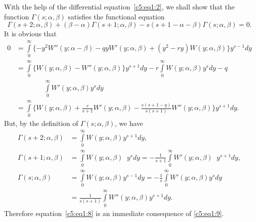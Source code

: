 With the help of the differential equation~\eqref{c5:eq1:2}, we shall show that the
function $\Gamma(s;\alpha,\beta)$ satisfies the functional equation
\begin{equation*}
\Gamma(s+2;\alpha,\beta) + (\beta-\alpha)\Gamma(s+1;\alpha,\beta)
-s(s+1 -\alpha-\beta) \Gamma
(s;\alpha,\beta) =0.\tag{8}\label{c5:eq1:8}
\end{equation*}
It is obvious that 
\begin{align*}
0 & = \int\limits^{\infty}_0 \{-y^2 W''(y;\alpha-\beta) - qy
W'(y;\alpha,\beta) + (y^2-ry) W(y;\alpha,\beta)\} y^{s-1} dy\\
& =\int\limits^{\infty}_0 \{W(y;\alpha,\beta) - W''(y;\alpha,\beta)\}
y^{s+1} dy-r\int\limits^{\infty}_0 W(y;\alpha,\beta) y^s dy-q\\
&\qquad\qquad\int\limits^{\infty}_0 W'(y;\alpha,\beta) y^s dy\\
& = \int\limits^{\infty}_0 \{W(y;\alpha,\beta) + \frac{r}{s+1}
W'(y;\alpha,\beta) -\frac{s(s+1-q)}{s(s+1)} W''(y;\alpha,\beta)\} y^{s+1}
 dy. \tag{9}\label{c5:eq1:9}
\end{align*}
But, by the definition of $\Gamma(s;\alpha,\beta)$, we have 
\begin{align*}
\Gamma(s+2;\alpha,\beta) & = \int\limits^{\infty}_0 W(y;\alpha,\beta)
y^{s+1} dy,\\
\Gamma(s+1;\alpha,\beta) & = \int\limits^{\infty}_0 W(y;\alpha,\beta)
\;\; y^s dy = -\frac{1}{s+1} \int\limits^{\infty}_0 W'(y;\alpha,\beta)
\;\; y^{s+1}dy, \\
\Gamma(s;\alpha,\beta) & =\int\limits^{\infty}_0 W(y;\alpha,\beta)
y^{s-1} dy = -\frac{1}{s} \int\limits^{\infty}_0 W'(y;\alpha,\beta)
y^s dy\\
& = \frac{1}{s(s+1)} \int\limits^{\infty}_0 W''(y;\alpha,\beta)
y^{s+1} dy. 
\end{align*}
Therefore \pageoriginale equation~\eqref{c5:eq1:8} is 
an immediate consequence of \eqref{c5:eq1:9}.

